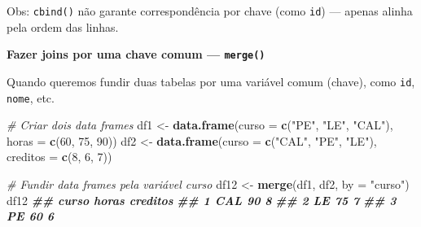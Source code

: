\documentclass[
]{book}
\newenvironment{Shaded}{\begin{snugshade}}{\end{snugshade}}
\newcommand{\AttributeTok}[1]{\textcolor[rgb]{0.13,0.29,0.53}{#1}}
\newcommand{\CommentTok}[1]{\textcolor[rgb]{0.56,0.35,0.01}{\textit{#1}}}
\newcommand{\DecValTok}[1]{\textcolor[rgb]{0.00,0.00,0.81}{#1}}
\newcommand{\DocumentationTok}[1]{\textcolor[rgb]{0.56,0.35,0.01}{\textbf{\textit{#1}}}}
\newcommand{\FunctionTok}[1]{\textcolor[rgb]{0.13,0.29,0.53}{\textbf{#1}}}
\newcommand{\NormalTok}[1]{#1}
\newcommand{\OtherTok}[1]{\textcolor[rgb]{0.56,0.35,0.01}{#1}}
\newcommand{\StringTok}[1]{\textcolor[rgb]{0.31,0.60,0.02}{#1}}
\begin{document}
Obs: \texttt{cbind()} não garante correspondência por chave (como \texttt{id}) --- apenas alinha pela ordem das linhas.

\textbf{Fazer joins por uma chave comum --- \texttt{merge()}}

Quando queremos fundir duas tabelas por uma variável comum (chave), como \texttt{id}, \texttt{nome}, etc.

\begin{Shaded}
\begin{Highlighting}[]
\CommentTok{\# Criar dois data frames}
\NormalTok{df1 }\OtherTok{\textless{}{-}} \FunctionTok{data.frame}\NormalTok{(}\AttributeTok{curso =} \FunctionTok{c}\NormalTok{(}\StringTok{"PE"}\NormalTok{, }\StringTok{"LE"}\NormalTok{, }\StringTok{"CAL"}\NormalTok{), }\AttributeTok{horas =} \FunctionTok{c}\NormalTok{(}\DecValTok{60}\NormalTok{, }\DecValTok{75}\NormalTok{, }\DecValTok{90}\NormalTok{))}
\NormalTok{df2 }\OtherTok{\textless{}{-}} \FunctionTok{data.frame}\NormalTok{(}\AttributeTok{curso =} \FunctionTok{c}\NormalTok{(}\StringTok{"CAL"}\NormalTok{, }\StringTok{"PE"}\NormalTok{, }\StringTok{"LE"}\NormalTok{), }\AttributeTok{creditos =} \FunctionTok{c}\NormalTok{(}\DecValTok{8}\NormalTok{, }\DecValTok{6}\NormalTok{, }\DecValTok{7}\NormalTok{))}

\CommentTok{\# Fundir data frames pela variável \textquotesingle{}curso\textquotesingle{}}
\NormalTok{df12 }\OtherTok{\textless{}{-}} \FunctionTok{merge}\NormalTok{(df1, df2, }\AttributeTok{by =} \StringTok{"curso"}\NormalTok{)}
\NormalTok{df12}
\DocumentationTok{\#\#   curso horas creditos}
\DocumentationTok{\#\# 1   CAL    90        8}
\DocumentationTok{\#\# 2    LE    75        7}
\DocumentationTok{\#\# 3    PE    60        6}
\end{Highlighting}
\end{Shaded}
\end{document}
